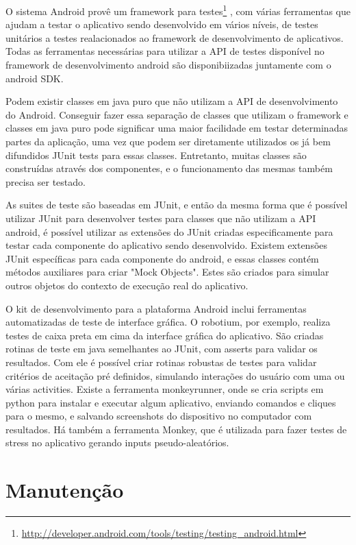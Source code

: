 O sistema Android provê um framework para testes\footnote{\url{http://developer.android.com/tools/testing/testing\_android.html}} , com várias ferramentas que ajudam a testar o aplicativo sendo desenvolvido em vários níveis, de testes unitários a testes realacionados ao framework de desenvolvimento de aplicativos. Todas as ferramentas necessárias para utilizar a API de testes disponível no framework de desenvolvimento android são disponibiizadas juntamente com o android SDK.

Podem existir classes em java puro que não utilizam a API de desenvolvimento do Android. Conseguir fazer essa separação de classes que utilizam o framework e classes em java puro pode significar uma maior facilidade em testar determinadas partes da aplicação, uma vez que podem ser diretamente utilizados os já bem difundidos JUnit tests para essas classes. Entretanto, muitas classes são construídas através dos componentes, e o funcionamento das mesmas também precisa ser testado.

As suites de teste são baseadas em JUnit, e então da mesma forma que é possível utilizar JUnit para desenvolver testes para classes que não utilizam a API android, é possível utilizar as extensões do JUnit criadas especificamente para testar cada componente do aplicativo sendo desenvolvido. Existem extensões JUnit específicas para cada componente do android, e essas classes contém métodos auxiliares para criar "Mock Objects". Estes são criados para simular outros objetos do contexto de execução real do aplicativo.

O kit de desenvolvimento para a plataforma Android inclui ferramentas automatizadas de teste de interface gráfica. O robotium, por exemplo, realiza testes de caixa preta em cima da interface gráfica do aplicativo. São criadas rotinas de teste em java semelhantes ao JUnit, com asserts para validar os resultados. Com ele é possível criar rotinas robustas de testes para validar critérios de aceitação pré definidos, simulando interações do usuário com uma ou várias activities. Existe a ferramenta monkeyrunner, onde se cria scripts em python para instalar e executar algum aplicativo, enviando comandos e cliques para o mesmo, e salvando screenshots do dispositivo no computador com resultados. Há também a ferramenta Monkey, que é utilizada para fazer testes de stress no aplicativo gerando inputs pseudo-aleatórios.

\section{Manutenção}

